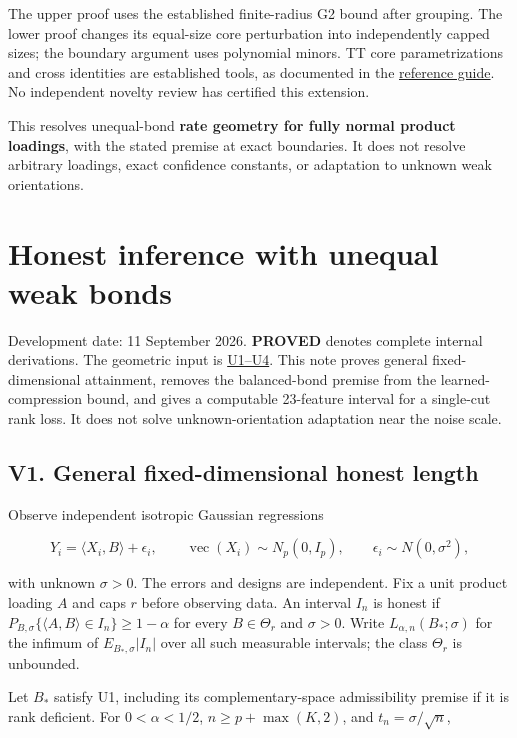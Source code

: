 \documentclass[
  11pt,
]{article}
\begin{document}
The upper proof uses the established finite-radius G2 bound after
grouping. The lower proof changes its equal-size core perturbation into
independently capped sizes; the boundary argument uses polynomial
minors. TT core parametrizations and cross identities are established
tools, as documented in the \href{../../references/README.md}{reference
guide}. No independent novelty review has certified this extension.

This resolves unequal-bond \textbf{rate geometry for fully normal
product loadings}, with the stated premise at exact boundaries. It does
not resolve arbitrary loadings, exact confidence constants, or
adaptation to unknown weak orientations.

\newpage

\section{Honest inference with unequal weak
bonds}\label{honest-inference-with-unequal-weak-bonds}

Development date: 11 September 2026. \textbf{PROVED} denotes complete
internal derivations. The geometric input is
\href{../../theory/unequal_bond_modulus.md}{U1--U4}. This note proves
general fixed-dimensional attainment, removes the balanced-bond premise
from the learned-compression bound, and gives a computable 23-feature
interval for a single-cut rank loss. It does not solve
unknown-orientation adaptation near the noise scale.

\subsection{V1. General fixed-dimensional honest
length}\label{v1.-general-fixed-dimensional-honest-length}

Observe independent isotropic Gaussian regressions

\[Y_i=\langle X_i,B\rangle+\epsilon_i,
\qquad \operatorname{vec}(X_i)\sim N_p(0,I_p),\qquad
\epsilon_i\sim N(0,\sigma^2),\]

with unknown \(\sigma>0\). The errors and designs are independent. Fix a
unit product loading \(A\) and caps \(r\) before observing data. An
interval \(I_n\) is honest if
\(P_{B,\sigma}\{\langle A,B\rangle\in I_n\}\ge1-\alpha\) for every
\(B\in\Theta_r\) and \(\sigma>0\). Write \(L_{\alpha,n}(B_*;\sigma)\)
for the infimum of \(E_{B_*,\sigma}|I_n|\) over all such measurable
intervals; the class \(\Theta_r\) is unbounded.

Let \(B_*\) satisfy U1, including its complementary-space admissibility
premise if it is rank deficient. For \(0<\alpha<1/2\),
\(n\ge p+\max(K,2)\), and \(t_n=\sigma/\sqrt n\),
\end{document}

